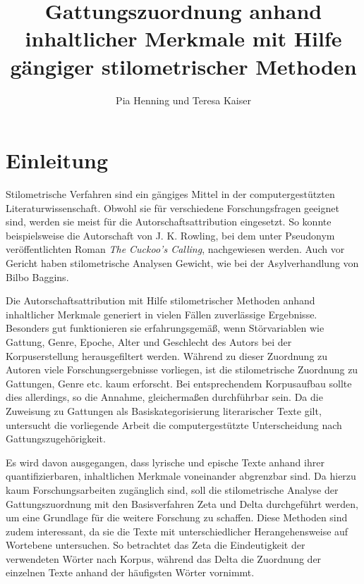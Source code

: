 \documentclass[a4paper,10p]{article}
\begin{document}
\title{Gattungszuordnung anhand inhaltlicher Merkmale mit Hilfe gängiger stilometrischer Methoden}
\author{Pia Henning und Teresa Kaiser}

\maketitle
\tableofcontents
\newpage
\listoffigures
\newpage
\section{Einleitung}
Stilometrische Verfahren sind ein gängiges Mittel in der computergestützten Literaturwissenschaft. Obwohl sie für verschiedene Forschungsfragen geeignet sind, werden sie meist für die Autorschaftsattribution eingesetzt. So konnte beispielsweise die Autorschaft von J. K. Rowling, bei dem unter Pseudonym veröffentlichten Roman \emph{The Cuckoo's Calling}, nachgewiesen werden. Auch vor Gericht haben stilometrische Analysen Gewicht, wie bei der Asylverhandlung von \glqq Bilbo Baggins\grqq \citep{Juola2015}.

Die Autorschaftsattribution mit Hilfe stilometrischer Methoden anhand inhaltlicher Merkmale generiert in vielen Fällen zuverlässige Ergebnisse. Besonders gut funktionieren sie erfahrungsgemäß, wenn Störvariablen wie Gattung, Genre, Epoche, Alter und Geschlecht des Autors bei der Korpuserstellung herausgefiltert werden. Während zu dieser Zuordnung zu Autoren viele Forschungsergebnisse vorliegen, ist die stilometrische Zuordnung zu Gattungen, Genre etc. kaum erforscht. Bei ent\-sprech\-en\-dem Korpusaufbau sollte dies allerdings, so die Annahme, gleichermaßen durchführbar sein. Da die Zuweisung zu Gattungen als Basiskategorisierung literarischer Texte gilt, untersucht die vorliegende Arbeit die computergestützte Unterscheidung nach Gattungszugehörigkeit. 

Es wird davon ausgegangen, dass lyrische und epische Texte anhand ihrer quantifizierbaren, inhaltlichen Merkmale voneinander abgrenzbar sind. Da hierzu kaum Forschungsarbeiten zugänglich sind, soll die stilometrische Analyse der Gattungszuordnung mit den Basisverfahren Zeta und Delta durchgeführt werden, um eine Grundlage für die weitere Forschung zu schaffen. Diese Methoden sind zudem interessant, da sie die Texte mit unterschiedlicher Herangehensweise auf Wortebene untersuchen. So betrachtet das Zeta die Eindeutigkeit der verwendeten Wörter nach Korpus, während das Delta die Zuordnung der einzelnen Texte anhand der häufigsten Wörter vornimmt. 
\end{document}
